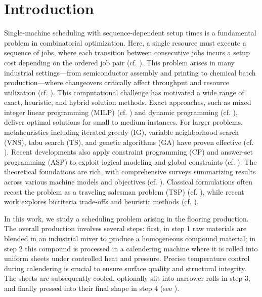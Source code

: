 \documentclass{article}
\theoremstyle{definition}
\begin{document}
\section{Introduction} \label{sec:introduction}
Single-machine scheduling with sequence-dependent setup times is a fundamental problem in combinatorial optimization. Here, a single resource must execute a sequence of jobs, where each transition between consecutive jobs incurs a setup cost depending on the ordered job pair (cf. \cite{santos1997scheduling, wang2011single}). %
This problem arises in many industrial settings—from semiconductor assembly and printing to chemical batch production—where changeovers critically affect throughput and resource utilization (cf. \cite{lin2022single, zheng2024single}). This computational challenge has motivated a wide range of exact, heuristic, and hybrid solution methods. Exact approaches, such as mixed integer linear programming (MILP) (cf. \cite{lin2022single, nesello2018exact}) and dynamic programming (cf. \cite{nesello2018exact}), deliver optimal solutions for small to medium instances. For larger problems, metaheuristics including iterated greedy (IG), variable neighborhood search (VNS), tabu search (TS), and genetic algorithms (GA) have proven effective (cf. \cite{balzereit2024scalable, deliktas2014single, lin2022single}). Recent developments also apply constraint programming (CP) and answer-set programming (ASP) to exploit logical modeling and global constraints (cf. \cite{heinz2022constraint}). The theoretical foundations are rich, with comprehensive surveys summarizing results across various machine models and objectives (cf. \cite{allahverdi1999review, yang1999survey, zhu2006scheduling}). Classical formulations often recast the problem as a traveling salesman problem (TSP) (cf. \cite{bagchi2006review, potts2009fifty}), while recent work explores bicriteria trade-offs and heuristic methods (cf. \cite{leib2022heuristic, schmitz2009bicriteria}).

In this work, we study a scheduling problem arising in the flooring production. The overall production involves several steps: first, in step 1 raw materials are blended in an industrial mixer to produce a homogeneous compound material; in step 2 this compound is processed in a calendering machine where it is rolled into uniform sheets under controlled heat and pressure. Precise temperature control during calendering is crucial to ensure surface quality and structural integrity. The sheets are subsequently cooled, optionally slit into narrower rolls in step 3, and finally pressed into their final shape in step 4 (see ).
\end{document}
